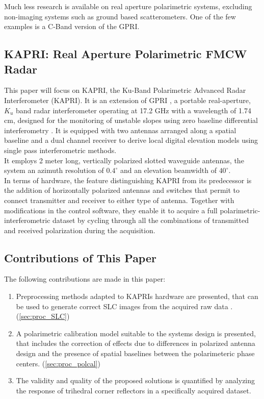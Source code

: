 Much less research is available on real aperture polarimetric systems, excluding non-imaging systems such as ground based scatterometers. One of the few examples is a C-Band version of the GPRI\cite{Cherukumilli2012}.
\subsection{KAPRI: Real Aperture Polarimetric FMCW Radar}
This paper will focus on KAPRI, the Ku-Band Polarimetric Advanced Radar Interferometer (KAPRI). It is an extension of GPRI \cite{werner_gpri_2012,Strozzi2011, Werner2008}, a portable real-aperture, $K_u$ band radar interferometer operating at 17.2 GHz with a wavelength of 1.74 cm, designed 
for the monitoring of unstable slopes using zero baseline differential interferometry \cite{Massonnet1993}. It is equipped with two antennas arranged along a spatial baseline and a dual channel receiver to derive local digital elevation models using single pass interferometric methods.\\
It employs  2 meter long, vertically polarized slotted waveguide antennas, the system an azimuth resolution of $0.4^\circ$ and an elevation beamwidth of $40^\circ$.\\
In terms of hardware, the feature distinguishing KAPRI from its predecessor is the addition of horizontally polarized antennas and switches that permit to connect transmitter and receiver to either type of antenna. Together with modifications in the control software, they enable it to acquire a full polarimetric-interferometric dataset by cycling through all the combinations of transmitted and received polarization during the acquisition.
\subsection{Contributions of This Paper}
The following contributions are made in this paper:
\begin{enumerate}
	\item Preprocessing methods adapted to KAPRIs hardware are presented, that can be used to generate correct SLC images from the acquired raw data . (\autoref{sec:proc_SLC})
	\item A polarimetric calibration model suitable to the systems design is presented, that includes the correction of effects due to differences in polarized antenna design and the presence of spatial baselines between the polarimeteric phase centers. (\autoref{sec:proc_polcal})
	\item The validity and quality of the proposed solutions is  quantified by analyzing the response of trihedral corner reflectors in a specifically acquired dataset.
\end{enumerate}

